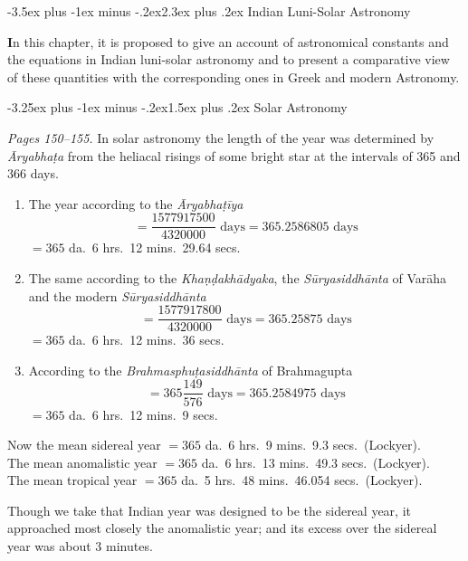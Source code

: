 \documentclass[11pt,a4paper]{article}
\makeatletter
\renewcommand{\section}{\@startsection {section}{1}{\z@}%
  {-3.5ex plus -1ex minus -.2ex}{2.3ex plus .2ex}%
  {\normalfont\Large\bfseries\color{sectioncolor}}}
\renewcommand{\subsection}{\@startsection{subsection}{2}{\z@}%
  {-3.25ex plus -1ex minus -.2ex}{1.5ex plus .2ex}%
  {\normalfont\large\bfseries\color{sectioncolor}}}
\newcommand{\cnote}[1]{\textcolor{notecolor}{\textit{#1}}}
\makeatother
\begin{document}
\section{Indian Luni-Solar Astronomy}
\label{sec:luni-solar}

\textbf{I}n this chapter, it is proposed to give an account of astronomical constants and the equations in Indian luni-solar astronomy and to present a comparative view of these quantities with the corresponding ones in Greek and modern Astronomy.

\subsection{Solar Astronomy}

\cnote{Pages 150--155.} In solar astronomy the length of the year was determined by \textit{Āryabhaṭa} from the heliacal risings of some bright star at the intervals of 365 and 366 days.

\begin{enumerate}[label=(\arabic*)]
\item The year according to the \textit{Āryabhaṭīya}
\[
= \frac{1577917500}{4320000} \text{ days} = 365.2586805 \text{ days}
\]
$= 365$ da.\ 6 hrs.\ 12 mins.\ 29.64 secs.

\item The same according to the \textit{Khaṇḍakhādyaka}, the \textit{Sūryasiddhānta} of Varāha and the modern \textit{Sūryasiddhānta}
\[
= \frac{1577917800}{4320000} \text{ days} = 365.25875 \text{ days}
\]
$= 365$ da.\ 6 hrs.\ 12 mins.\ 36 secs.

\item According to the \textit{Brahmasphuṭasiddhānta} of Brahmagupta
\[
= 365\frac{149}{576} \text{ days} = 365.2584975 \text{ days}
\]
$= 365$ da.\ 6 hrs.\ 12 mins.\ 9 secs.
\end{enumerate}

Now the mean sidereal year $= 365$ da.\ 6 hrs.\ 9 mins.\ 9.3 secs.\ (Lockyer).\\
The mean anomalistic year $= 365$ da.\ 6 hrs.\ 13 mins.\ 49.3 secs.\ (Lockyer).\\
The mean tropical year $= 365$ da.\ 5 hrs.\ 48 mins.\ 46.054 secs.\ (Lockyer).

Though we take that Indian year was designed to be the sidereal year, it approached most closely the anomalistic year; and its excess over the sidereal year was about 3 minutes.
\end{document}
